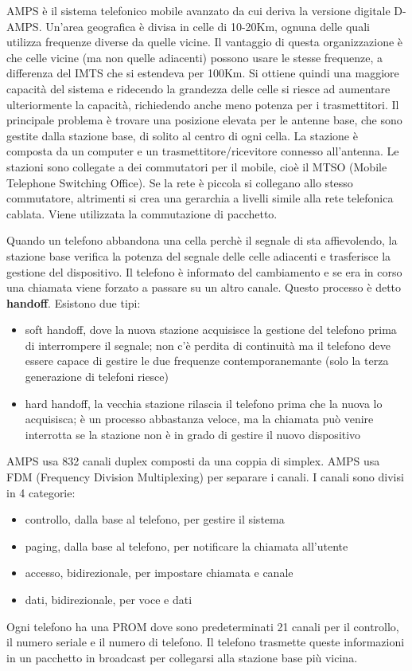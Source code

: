 AMPS è il sistema telefonico mobile avanzato da cui deriva la versione digitale D-AMPS.
Un'area geografica è divisa in celle di 10-20Km, ognuna delle quali utilizza frequenze diverse da quelle vicine.
Il vantaggio di questa organizzazione è che celle vicine (ma non quelle adiacenti) possono usare le stesse frequenze, a differenza del IMTS che si estendeva per 100Km.
Si ottiene quindi una maggiore capacità del sistema e ridecendo la grandezza delle celle si riesce ad aumentare ulteriormente la capacità, richiedendo anche meno potenza per i trasmettitori.
Il principale problema è trovare una posizione elevata per le antenne base, che sono gestite dalla stazione base, di solito al centro di ogni cella.
La stazione è composta da un computer e un trasmettitore/ricevitore connesso all'antenna.
Le stazioni sono collegate a dei commutatori per il mobile, cioè il MTSO (Mobile Telephone Switching Office).
Se la rete è piccola si collegano allo stesso commutatore, altrimenti si crea una gerarchia a livelli simile alla rete telefonica cablata.
Viene utilizzata la commutazione di pacchetto.

Quando un telefono abbandona una cella perchè il segnale di sta affievolendo, la stazione base verifica la potenza del segnale delle celle adiacenti e trasferisce la gestione del dispositivo.
Il telefono è informato del cambiamento e se era in corso una chiamata viene forzato a passare su un altro canale. 
Questo processo è detto \textbf{handoff}. Esistono due tipi:
\begin{itemize}
    \item soft handoff, dove la nuova stazione acquisisce la gestione del telefono prima di interrompere il segnale;
    non c'è perdita di continuità ma il telefono deve essere capace di gestire le due frequenze contemporanemante (solo la terza generazione di telefoni riesce)
    \item hard handoff, la vecchia stazione rilascia il telefono prima che la nuova lo acquisisca;
    è un processo abbastanza veloce, ma la chiamata può venire interrotta se la stazione non è in grado di gestire il nuovo dispositivo
\end{itemize}
AMPS usa 832 canali duplex composti da una coppia di simplex. 
AMPS usa FDM (Frequency Division Multiplexing) per separare i canali.
I canali sono divisi in 4 categorie:
\begin{itemize}
    \item controllo, dalla base al telefono, per gestire il sistema
    \item paging, dalla base al telefono, per notificare la chiamata all'utente
    \item accesso, bidirezionale, per impostare chiamata e canale
    \item dati, bidirezionale, per voce e dati
\end{itemize}
Ogni telefono ha una PROM dove sono predeterminati 21 canali per il controllo, il numero seriale e il numero di telefono. 
Il telefono trasmette queste informazioni in un pacchetto in broadcast per collegarsi alla stazione base più vicina.

